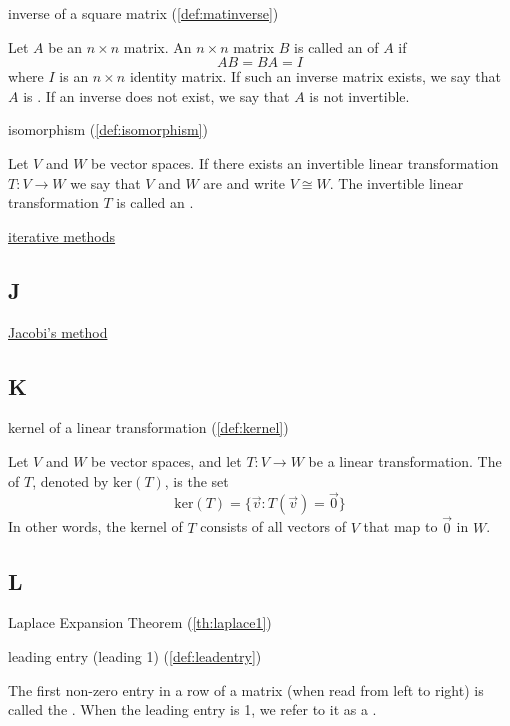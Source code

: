 \documentclass{ximera}
\begin{document}
inverse of a square matrix (\ref{def:matinverse})
\begin{expandable}
    Let $A$ be an $n\times n$ matrix.  An $n\times n$ matrix $B$ is called an  of $A$ if 
$$AB=BA=I$$
where $I$ is an $n\times n$ identity matrix.  If such an inverse matrix exists, we say that $A$ is .  If an inverse does not exist, we say that $A$ is not invertible.
\end{expandable}

isomorphism (\ref{def:isomorphism})
\begin{expandable}
    Let $V$ and $W$ be vector spaces.  If there exists an invertible linear transformation $T:V\rightarrow W$ we say that $V$ and $W$ are  and write $V\cong W$.  The invertible linear transformation $T$ is called an .
\end{expandable}


\href{https://ximera.osu.edu/oerlinalg/LinearAlgebra/SYS-0040/main}{iterative methods}

\subsection{J}

\href{https://ximera.osu.edu/oerlinalg/LinearAlgebra/SYS-0040/main}{Jacobi's method}


\subsection{K}

kernel of a linear transformation (\ref{def:kernel})
\begin{expandable}
    Let $V$ and $W$ be vector spaces, and let $T:V\rightarrow W$ be a linear transformation.  The  of $T$, denoted by $\mbox{ker}(T)$, is the set
$$\mbox{ker}(T)=\{\vec{v}:T(\vec{v})=\vec{0}\}$$
In other words, the kernel of $T$ consists of all vectors of $V$ that map to $\vec{0}$ in $W$.
\end{expandable}

\subsection{L}

Laplace Expansion Theorem (\ref{th:laplace1})

leading entry (leading 1) (\ref{def:leadentry})
\begin{expandable}
    The first non-zero entry in a row of a matrix (when read from left to right) is called the .  When the leading entry is 1, we refer to it as a .
\end{expandable}
\end{document}
